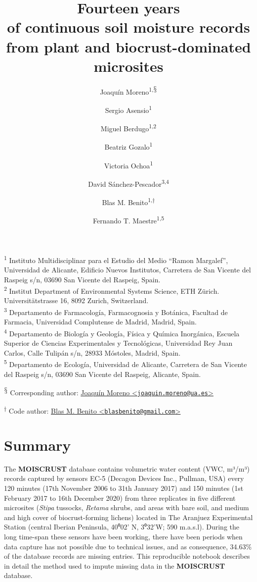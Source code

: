 \documentclass[
  table]{article}
\title{Fourteen years\\
of continuous soil moisture records\\
from plant and biocrust-dominated microsites}
\author{Joaquín Moreno\textsuperscript{1,$\mathsection{}$} \and Sergio Asensio\textsuperscript{1} \and Miguel Berdugo\textsuperscript{1,2} \and Beatriz Gozalo\textsuperscript{1} \and Victoria Ochoa\textsuperscript{1} \and David Sánchez-Pescador\textsuperscript{3,4} \and Blas M. Benito\textsuperscript{1,$\dagger{}$} \and Fernando T. Maestre\textsuperscript{1,5}}
\date{}
\begin{document}
\maketitle

\textsuperscript{1} Instituto Multidisciplinar para el Estudio del Medio
``Ramon Margalef'', Universidad de Alicante, Edificio Nuevos Institutos,
Carretera de San Vicente del Raspeig s/n, 03690 San Vicente del Raspeig,
Spain.\\
\textsuperscript{2} Institut Department of Environmental Systems
Science, ETH Zürich. Universitätstrasse 16, 8092 Zurich, Switzerland.\\
\textsuperscript{3} Departamento de Farmacología, Farmacognosia y
Botánica, Facultad de Farmacia, Universidad Complutense de Madrid,
Madrid, Spain.\\
\textsuperscript{4} Departamento de Biología y Geología, Física y
Química Inorgánica, Escuela Superior de Ciencias Experimentales y
Tecnológicas, Universidad Rey Juan Carlos, Calle Tulipán s/n, 28933
Móstoles, Madrid, Spain.\\
\textsuperscript{5} Departamento de Ecología, Universidad de Alicante,
Carretera de San Vicente del Raspeig s/n, 03690 San Vicente del Raspeig,
Alicante, Spain.

\textsuperscript{$\mathsection{}$} Corresponding author:
\href{mailto:joaquin.moreno@ua.es}{Joaquín Moreno
\textless{}\href{mailto:joaquin.moreno@ua.es}{\nolinkurl{joaquin.moreno@ua.es}}\textgreater{}}

\textsuperscript{$\dagger{}$} Code author:
\href{mailto:blasbenito@gmail.com}{Blas M. Benito
\textless{}\href{mailto:blasbenito@gmail.com}{\nolinkurl{blasbenito@gmail.com}}\textgreater{}}

\let\thefootnote\relax{}

\newpage 
\tableofcontents 
\newpage

\hypertarget{summary}{%
\section{Summary}\label{summary}}

The \textbf{MOISCRUST} database contains volumetric water content (VWC,
m³/m³) records captured by sensors EC-5 (Decagon Devices Inc., Pullman,
USA) every 120 minutes (17th November 2006 to 31th January 2017) and 150
minutes (1st February 2017 to 16th December 2020) from three replicates
in five different microsites (\emph{Stipa} tussocks, \emph{Retama}
shrubs, and areas with bare soil, and medium and high cover of
biocrust-forming lichens) located in The Aranjuez Experimental Station
(central Iberian Peninsula, 40⁰02' N, 3⁰32'W; 590 m.a.s.l). During the
long time-span these sensors have been working, there have been periods
when data capture has not possible due to technical issues, and as
consequence, 34.63\% of the database records are missing entries. This
reproducible notebook describes in detail the method used to impute
missing data in the \textbf{MOISCRUST} database.
\end{document}
